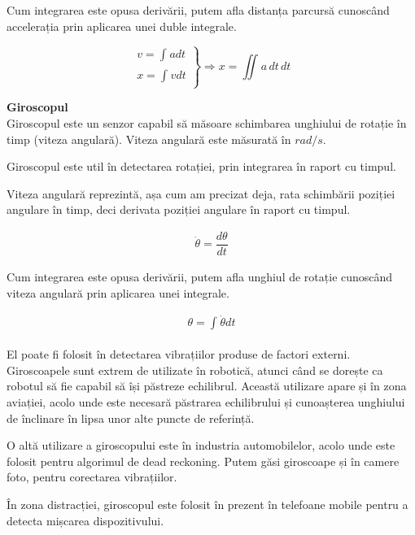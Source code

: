 \documentclass[12pt,a4paper]{article}
\begin{document}
Cum integrarea este opusa derivării, putem afla distanța parcursă cunoscând accelerația prin aplicarea unei duble integrale.

\begin{equation} 
\left.
\begin{aligned} v = \int_{}^{} a dt\\ x = \int_{}^{} v dt \end{aligned} \right\} \Rightarrow x = \iint_{} a \,dt\,dt
\end{equation}


\textbf{Giroscopul}\\
Giroscopul este un senzor capabil să măsoare schimbarea unghiului de rotație în timp (viteza angulară). Viteza angulară este măsurată în $rad/s$.

Giroscopul este util în detectarea rotației, prin integrarea în raport cu timpul. 

Viteza angulară reprezintă, așa cum am precizat deja, rata schimbării poziției angulare în timp, deci derivata poziției angulare în raport cu timpul.

\begin{equation} 
\left.
\begin{aligned} \dot{\theta} = \dfrac{d \theta}{dt} \end{aligned}
\right.
\end{equation} 

Cum integrarea este opusa derivării, putem afla unghiul de rotație cunoscând viteza angulară prin aplicarea unei integrale.

\begin{equation} 
\left.
\begin{aligned} \theta = \int_{}^{} \dot{\theta} dt \end{aligned}
\right.
\end{equation} 

El poate fi folosit în detectarea vibrațiilor produse de factori externi. Giroscoapele sunt extrem de utilizate în robotică, atunci când se dorește ca robotul să fie capabil să își păstreze echilibrul. Această utilizare apare și în zona aviației, acolo unde este necesară păstrarea echilibrului și cunoașterea unghiului de înclinare în lipsa unor alte puncte de referință.

O altă utilizare a giroscopului este în industria automobilelor, acolo unde este folosit pentru algorimul de dead reckoning. Putem găsi giroscoape și în camere foto, pentru corectarea vibrațiilor.

În zona distracției, giroscopul este folosit în prezent în telefoane mobile pentru a detecta mișcarea dispozitivului.\\
\end{document}

